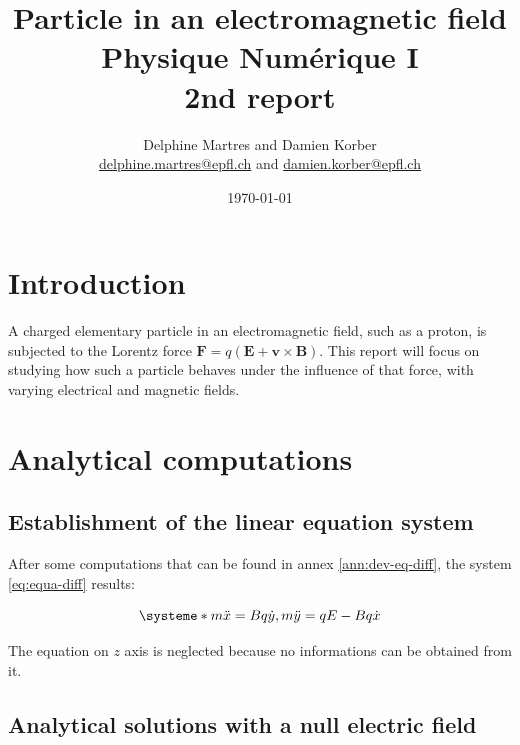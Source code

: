 \documentclass[a4paper,12pt,twoside]{article}
\newcommand{\mail}[1]{{\href{mailto:#1}{#1}}}
\begin{document}
\title{Particle in an electromagnetic field\\{\small Physique Numérique I}\\{\small 2nd report}}
\date{\today}
\author{Delphine Martres and Damien Korber\\{\small \mail{delphine.martres@epfl.ch} and \mail{damien.korber@epfl.ch}}}
\maketitle
\tableofcontents %

\baselineskip=16pt
\parindent=15pt
\parskip=5pt




\section{Introduction}
A charged elementary particle in an electromagnetic field, such as a proton, is subjected to the Lorentz force $\mathbf{F}=q(\mathbf{E} + \mathbf{v} \times \mathbf{B})$.
This report will focus on studying how such a particle behaves under the influence of that force, with varying electrical and magnetic fields.

\section{Analytical computations}
\subsection{Establishment of the linear equation system}
After some computations that can be found in annex \ref{ann:dev-eq-diff}, the system \ref{eq:equa-diff} results:

\begin{equation}
\systeme*{m\ddot{x} = Bq\dot{y}, m\ddot{y} = qE - Bq\dot{x}}
\label{eq:equa-diff}
\end{equation}

The equation on $z$ axis is neglected because no informations can be obtained from it.

\subsection{Analytical solutions with a null electric field}
\end{document}
